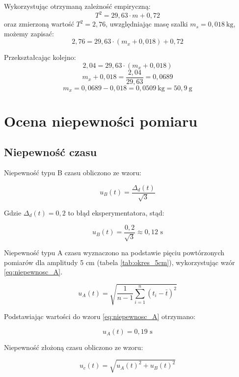 \documentclass[a4paper,12pt]{article}
\begin{document}
Wykorzystując otrzymaną zależność empiryczną:
\[
    T^2 = 29{,}63 \cdot m + 0{,}72
\]
oraz zmierzoną wartość \( T^2 = 2{,}76 \), uwzględniając masę szalki \( m_s = 0{,}018\ \text{kg} \), możemy zapisać:
\[
    2{,}76 = 29{,}63 \cdot (m_x + 0{,}018) + 0{,}72
\]

Przekształcając kolejno:
\[
    2{,}04 = 29{,}63 \cdot (m_x + 0{,}018)
\]
\[
    m_x + 0{,}018 = \frac{2{,}04}{29{,}63} = 0{,}0689
\]
\[
    m_x = 0{,}0689 - 0{,}018 = 0{,}0509\ \text{kg} = 50{,}9\ \text{g}
\]





\section{Ocena niepewności pomiaru}

\subsection{Niepewność czasu}

Niepewność typu B czasu obliczono ze wzoru:

\begin{equation*}
    u_B(t) = \frac{\Delta_d(t)}{\sqrt{3}}
\end{equation*}

Gdzie $\Delta_d(t) = 0,2$ to błąd eksperymentatora, stąd:

\begin{equation*}
    u_B(t) = \frac{0,2}{\sqrt{3}} \approx 0,12 \text{ s}
\end{equation*}

Niepewność typu A czasu wyznaczono na podstawie pięciu powtórzonych pomiarów dla amplitudy 5 cm (tabela \ref{tab:okres_5cm}), wykorzystując wzór \ref{eq:niepewnosc_A}.

\begin{equation} \label{eq:niepewnosc_A}
    u_A(t) = \sqrt{\frac{1}{n-1} \sum_{i=1}^{n} (t_i - \bar{t})^2}
\end{equation}

Podstawiając wartości do wzoru \ref{eq:niepewnosc_A} otrzymano:

\begin{equation*}
    u_A(t) = 0{,}19 \text{ s}
\end{equation*}

Niepewność złożoną czasu obliczono ze wzoru:

\begin{equation*}
    u_c(t) = \sqrt{u_A(t)^2 + u_B(t)^2}
\end{equation*}
\end{document}
